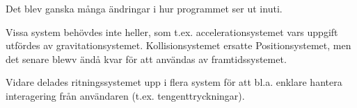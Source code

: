 Det blev ganska många ändringar i hur programmet ser ut inuti.

Vissa system behövdes inte heller, som t.ex. accelerationsystemet
vars uppgift utfördes av gravitationsystemet.
Kollisionsystemet ersatte Positionsystemet,
men det senare blewv ändå kvar för att användas av framtidssystemet.

Vidare delades ritningssystemet upp i flera system
för att bl.a. enklare hantera interagering från användaren (t.ex. tengenttryckningar).


